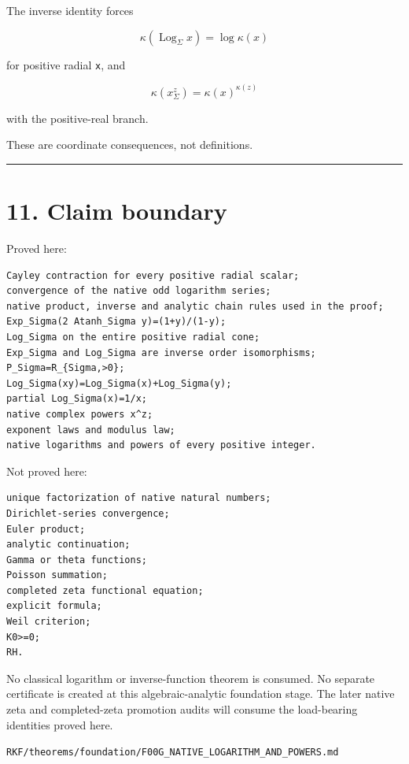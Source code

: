 The inverse identity forces

\[
\kappa(\operatorname{Log}_\Sigma x)=\log\kappa(x)
\]

for positive radial \texttt{x}, and

\[
\kappa(x^z_\Sigma)=
\kappa(x)^{\kappa(z)}
\]

with the positive-real branch.

These are coordinate consequences, not definitions.

\begin{center}\rule{0.5\linewidth}{0.5pt}\end{center}

\hypertarget{claim-boundary}{%
\section{11. Claim boundary}\label{claim-boundary}}

Proved here:

\begin{verbatim}
Cayley contraction for every positive radial scalar;
convergence of the native odd logarithm series;
native product, inverse and analytic chain rules used in the proof;
Exp_Sigma(2 Atanh_Sigma y)=(1+y)/(1-y);
Log_Sigma on the entire positive radial cone;
Exp_Sigma and Log_Sigma are inverse order isomorphisms;
P_Sigma=R_{Sigma,>0};
Log_Sigma(xy)=Log_Sigma(x)+Log_Sigma(y);
partial Log_Sigma(x)=1/x;
native complex powers x^z;
exponent laws and modulus law;
native logarithms and powers of every positive integer.
\end{verbatim}

Not proved here:

\begin{verbatim}
unique factorization of native natural numbers;
Dirichlet-series convergence;
Euler product;
analytic continuation;
Gamma or theta functions;
Poisson summation;
completed zeta functional equation;
explicit formula;
Weil criterion;
K0>=0;
RH.
\end{verbatim}

No classical logarithm or inverse-function theorem is consumed. No separate
certificate is created at this algebraic-analytic foundation stage. The later
native zeta and completed-zeta promotion audits will consume the load-bearing
identities proved here.

\begin{flushright}\small\texttt{RKF/theorems/foundation/F00G\_NATIVE\_LOGARITHM\_AND\_POWERS.md}\end{flushright}
